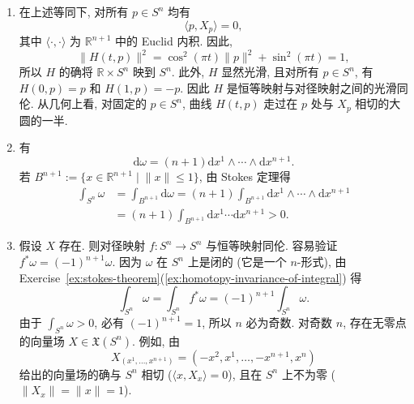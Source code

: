 \begin{description}[font=\normalfont,leftmargin=2em,labelwidth=1.5em]
\begin{enumerate}[label=(\alph*),ref=\alph*,leftmargin=*]
\item 在上述等同下, 对所有 $p\in S^n$ 均有
\[
  \langle p,X_p\rangle=0,
\]
其中 $\langle\cdot,\cdot\rangle$ 为 $\mathbb{R}^{n+1}$ 中的 Euclid 内积. 因此,
\[
  \lVert H(t,p)\rVert^2=\cos^2(\pi t)\lVert p\rVert^2+\sin^2(\pi t)=1,
\]
所以 $H$ 的确将 $\mathbb{R}\times S^n$ 映到 $S^n$. 此外, $H$ 显然光滑, 且对所有 $p\in S^n$, 有 $H(0,p)=p$ 和 $H(1,p)=-p$. 因此 $H$ 是恒等映射与对径映射之间的光滑同伦. 从几何上看, 对固定的 $p\in S^n$, 曲线 $H(t,p)$ 走过在 $p$ 处与 $X_p$ 相切的大圆的一半.
\item 有
\[
  \mathrm{d}\omega=(n+1)\mathrm{d}x^1\wedge\cdots\wedge\mathrm{d}x^{n+1}.
\]
若 $B^{n+1}:=\{x\in\mathbb{R}^{n+1}\mid\lVert x\rVert\le1\}$, 由 Stokes 定理得
\begin{align*}
  \int_{S^n}\omega&=\int_{B^{n+1}}\mathrm{d}\omega
  =(n+1)\int_{B^{n+1}}\mathrm{d}x^1\wedge\cdots\wedge\mathrm{d}x^{n+1}\\
  &=(n+1)\int_{B^{n+1}}\mathrm{d}x^1\cdots\mathrm{d}x^{n+1}>0.
\end{align*}
\item 假设 $X$ 存在. 则对径映射 $f:S^n\to S^n$ 与恒等映射同伦. 容易验证 $f^*\omega=(-1)^{n+1}\omega$. 因为 $\omega$ 在 $S^n$ 上是闭的 (它是一个 $n$-形式), 由 Exercise~\ref{ex:stokes-theorem}(\ref{ex:homotopy-invariance-of-integral}) 得
\[
  \int_{S^n}\omega=\int_{S^n}f^*\omega=(-1)^{n+1}\int_{S^n}\omega.
\]
由于 $\int_{S^n}\omega>0$, 必有 $(-1)^{n+1}=1$, 所以 $n$ 必为奇数. 对奇数 $n$, 存在无零点的向量场 $X\in\mathfrak{X}(S^n)$. 例如, 由
\[
  X_{(x^1,\ldots,x^{n+1})}=(-x^2,x^1,\ldots,-x^{n+1},x^n)
\]
给出的向量场的确与 $S^n$ 相切 ($\langle x,X_x\rangle=0$), 且在 $S^n$ 上不为零 ($\lVert X_x\rVert=\lVert x\rVert=1$).
\end{enumerate}
\end{description}
